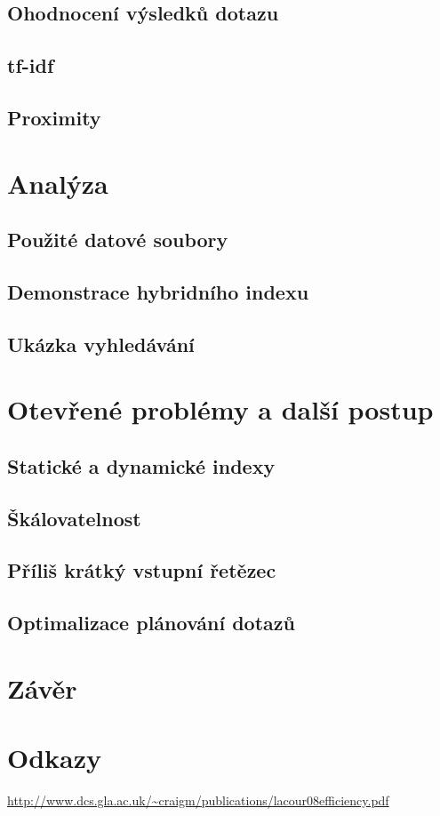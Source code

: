\documentclass[12pt]{article}
\begin{document}
\subsection{Ohodnocení výsledků dotazu}
\subsection{tf-idf}
\subsection{Proximity}


\section{Analýza}
\subsection{Použité datové soubory}
\subsection{Demonstrace hybridního indexu}
\subsection{Ukázka vyhledávání}

\section{Otevřené problémy a další postup}
\subsection{Statické a dynamické indexy}
\subsection{Škálovatelnost}
\subsection{Příliš krátký vstupní řetězec}
\subsection{Optimalizace plánování dotazů}


\section{Závěr}

\section{Odkazy}
\url{http://www.dcs.gla.ac.uk/~craigm/publications/lacour08efficiency.pdf}
\end{document}
